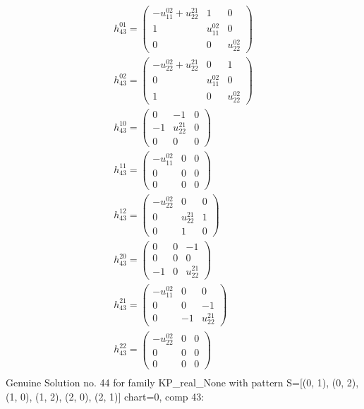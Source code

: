 \documentclass[a4paper, 11pt, twoside, onecolumn]{article}
\begin{document}
\begin{landscape}
\begin{gather*}
	 h_{43}^{01}=\begin{pmatrix}- u^{02}_{11} + u^{21}_{22} & 1 & 0\\1 & u^{02}_{11} & 0\\0 & 0 & u^{02}_{22}\end{pmatrix}\\ 
	 h_{43}^{02}=\begin{pmatrix}- u^{02}_{22} + u^{21}_{22} & 0 & 1\\0 & u^{02}_{11} & 0\\1 & 0 & u^{02}_{22}\end{pmatrix}\\ 
	 h_{43}^{10}=\begin{pmatrix}0 & -1 & 0\\-1 & u^{21}_{22} & 0\\0 & 0 & 0\end{pmatrix}\\ 
	 h_{43}^{11}=\begin{pmatrix}- u^{02}_{11} & 0 & 0\\0 & 0 & 0\\0 & 0 & 0\end{pmatrix}\\ 
	 h_{43}^{12}=\begin{pmatrix}- u^{02}_{22} & 0 & 0\\0 & u^{21}_{22} & 1\\0 & 1 & 0\end{pmatrix}\\ 
	 h_{43}^{20}=\begin{pmatrix}0 & 0 & -1\\0 & 0 & 0\\-1 & 0 & u^{21}_{22}\end{pmatrix}\\ 
	 h_{43}^{21}=\begin{pmatrix}- u^{02}_{11} & 0 & 0\\0 & 0 & -1\\0 & -1 & u^{21}_{22}\end{pmatrix}\\ 
	 h_{43}^{22}=\begin{pmatrix}- u^{02}_{22} & 0 & 0\\0 & 0 & 0\\0 & 0 & 0\end{pmatrix}\\ 
\end{gather*} 
Genuine Solution no. 44 for family KP_real_None with pattern S=[(0, 1), (0, 2), (1, 0), (1, 2), (2, 0), (2, 1)] chart=0, comp 43: 
\begin{gather*} 

\end{gather*}
\end{landscape}
\end{document}

